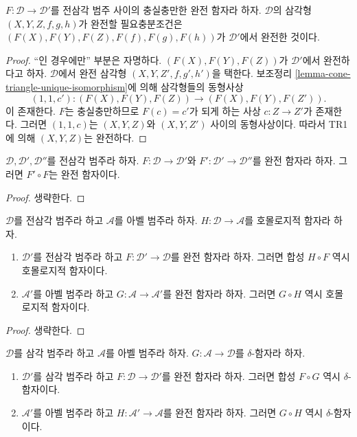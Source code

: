 \begin{lemma}
\label{lemma-exact-equivalence}
$F : \mathcal{D} \to \mathcal{D}'$를 전삼각 범주 사이의 충실충만한
완전 함자라 하자. $\mathcal{D}$의 삼각형 $(X, Y, Z, f, g, h)$가
완전할 필요충분조건은
$(F(X), F(Y), F(Z), F(f), F(g), F(h))$가 $\mathcal{D}'$에서
완전한 것이다.
\end{lemma}

\begin{proof}
“인 경우에만” 부분은 자명하다.
$(F(X), F(Y), F(Z))$가 $\mathcal{D}'$에서 완전하다고 하자.
$\mathcal{D}$에서 완전 삼각형 $(X, Y, Z', f, g', h')$을 택한다.
보조정리 \ref{lemma-cone-triangle-unique-isomorphism}에 의해
삼각형들의 동형사상
$$
(1, 1, c') : (F(X), F(Y), F(Z)) \longrightarrow (F(X), F(Y), F(Z')).
$$
이 존재한다. $F$는 충실충만하므로 $F(c) = c'$가 되게 하는 사상
$c : Z \to Z'$가 존재한다. 그러면 $(1, 1, c)$는 $(X, Y, Z)$와
$(X, Y, Z')$ 사이의 동형사상이다. 따라서 TR1에 의해 $(X, Y, Z)$는
완전하다.
\end{proof}

\begin{lemma}
\label{lemma-composition-exact}
$\mathcal{D}, \mathcal{D}', \mathcal{D}''$를 전삼각 범주라 하자.
$F : \mathcal{D} \to \mathcal{D}'$와
$F' : \mathcal{D}' \to \mathcal{D}''$를 완전 함자라 하자.
그러면 $F' \circ F$는 완전 함자이다.
\end{lemma}

\begin{proof}
생략한다.
\end{proof}

\begin{lemma}
\label{lemma-exact-compose-homological-functor}
$\mathcal{D}$를 전삼각 범주라 하고 $\mathcal{A}$를 아벨 범주라 하자.
$H : \mathcal{D} \to \mathcal{A}$를 호몰로지적 함자라 하자.
\begin{enumerate}
\item $\mathcal{D}'$를 전삼각 범주라 하고
$F : \mathcal{D}' \to \mathcal{D}$를 완전 함자라 하자.
그러면 합성 $H \circ F$ 역시 호몰로지적 함자이다.
\item $\mathcal{A}'$를 아벨 범주라 하고
$G : \mathcal{A} \to \mathcal{A}'$를 완전 함자라 하자.
그러면 $G \circ H$ 역시 호몰로지적 함자이다.
\end{enumerate}
\end{lemma}

\begin{proof}
생략한다.
\end{proof}

\begin{lemma}
\label{lemma-exact-compose-delta-functor}
$\mathcal{D}$를 삼각 범주라 하고 $\mathcal{A}$를 아벨 범주라 하자.
$G : \mathcal{A} \to \mathcal{D}$를 $\delta$-함자라 하자.
\begin{enumerate}
\item $\mathcal{D}'$를 삼각 범주라 하고
$F : \mathcal{D} \to \mathcal{D}'$를 완전 함자라 하자.
그러면 합성 $F \circ G$ 역시 $\delta$-함자이다.
\item $\mathcal{A}'$를 아벨 범주라 하고
$H : \mathcal{A}' \to \mathcal{A}$를 완전 함자라 하자.
그러면 $G \circ H$ 역시 $\delta$-함자이다.
\end{enumerate}
\end{lemma}

